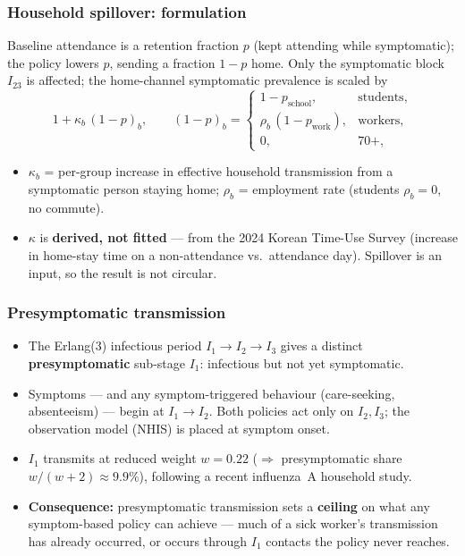 \documentclass[dvipsnames, 10pt]{beamer}
\begin{document}
\begin{frame}\frametitle{Household spillover: formulation}
    Baseline attendance is a retention fraction $p$ (kept attending while
    symptomatic); the policy lowers $p$, sending a fraction $1-p$ home. Only the
    symptomatic block $I_{23}$ is affected; the home-channel symptomatic
    prevalence is scaled by
    \begin{equation*}
        1 + \kappa_b\,(1-p)_b ,
        \qquad
        (1-p)_b =
        \begin{cases}
            1 - p_{\mathrm{school}}, & \text{students},\\
            \rho_b\,(1 - p_{\mathrm{work}}), & \text{workers},\\
            0, & 70+,
        \end{cases}
    \end{equation*}
    \begin{itemize}\small
        \item $\kappa_b$ = per-group increase in effective household transmission
              from a symptomatic person staying home; $\rho_b$ = employment rate
              (students $\rho_b=0$, no commute).
        \item $\kappa$ is \textbf{derived, not fitted} --- from the 2024 Korean
              Time-Use Survey (increase in home-stay time on a non-attendance vs.\
              attendance day). Spillover is an input, so the result is not circular.
    \end{itemize}
\end{frame}

\begin{frame}\frametitle{Presymptomatic transmission}
    \begin{itemize}
        \item The Erlang(3) infectious period $I_1\!\to\!I_2\!\to\!I_3$ gives a
              distinct \textbf{presymptomatic} sub-stage $I_1$: infectious but not
              yet symptomatic.
        \item Symptoms --- and any symptom-triggered behaviour (care-seeking,
              absenteeism) --- begin at $I_1\!\to\!I_2$. Both policies act only on
              $I_2, I_3$; the observation model (NHIS) is placed at symptom onset.
        \item $I_1$ transmits at reduced weight $w=0.22$
              ($\Rightarrow$ presymptomatic share $w/(w+2)\approx 9.9\%$),
              following a recent influenza~A household study.
        \item \textbf{Consequence:} presymptomatic transmission sets a
              \textbf{ceiling} on what any symptom-based policy can achieve ---
              much of a sick worker's transmission has already occurred, or occurs
              through $I_1$ contacts the policy never reaches.
    \end{itemize}
\end{frame}
\end{document}
